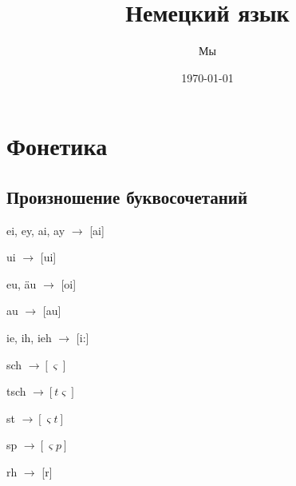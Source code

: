 \documentclass[oneside]{book}
\title{Немецкий язык}
\date{\today}
\author{Мы}
\begin{document}
    \maketitle

    \tableofcontents

    \chapter{Фонетика}
    \section{Произношение буквосочетаний}
    ei, ey, ai, ay
    \begin{math}
        \longrightarrow
    \end{math}
    [ai]

    ui
    \begin{math}
        \longrightarrow
    \end{math}
    [ui]

    eu, \"au
    \begin{math}
        \longrightarrow
    \end{math}
    [oi]

    au
    \begin{math}
        \longrightarrow
    \end{math}
    [au]

    ie, ih, ieh
    \begin{math}
        \longrightarrow
    \end{math}
    [i:]

    sch
    \begin{math}
        \longrightarrow [\varsigma]
    \end{math}

    tsch
    \begin{math}
        \longrightarrow [t\varsigma]
    \end{math}

    st
    \begin{math}
        \longrightarrow [\varsigma t]
    \end{math}

    sp
    \begin{math}
        \longrightarrow [\varsigma p]
    \end{math}

    rh
    \begin{math}
        \longrightarrow
    \end{math}
    [r]
\end{document}
